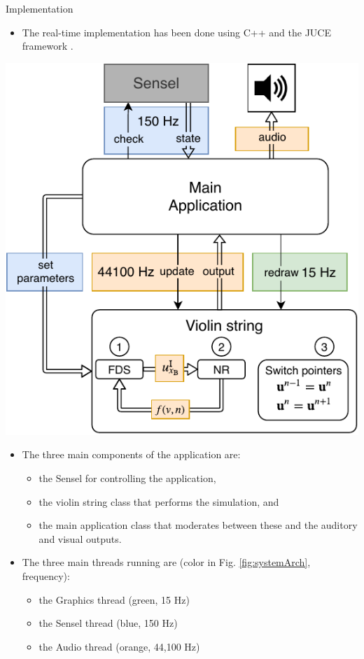 \documentclass[a0paper,portrait]{baposter}
\begin{document}
\begin{poster}
\begin{posterbox}[name=implementation,column=1,row=0]{Implementation}
\begin{itemize}
    \item The real-time implementation has been done using C++ and the JUCE framework \cite{JUCE}.
\end{itemize}
\begin{center}
    \includegraphics[width=0.95\columnwidth]{systemArch.pdf}
    \label{fig:systemArch}
\end{center}
\begin{itemize}
    \item The three main components of the application are:
    \begin{itemize}
        \item the Sensel for controlling the application,
        \item the violin string class that performs the simulation, and
        \item the main application class that moderates between these and the auditory and visual outputs.
    \end{itemize}
    \item The three main threads running are (color in Fig. \ref{fig:systemArch}, frequency):
    \begin{itemize}
        \item the Graphics thread (green, 15 Hz)
        \item the Sensel thread (blue, 150 Hz)
        \item the Audio thread (orange, 44,100 Hz)
    \end{itemize}
\end{itemize}
\end{posterbox}


\end{poster}
\end{document}

